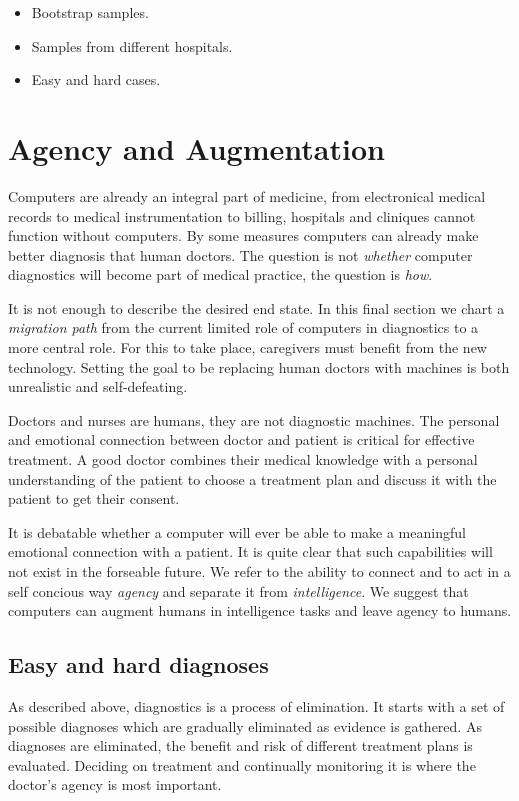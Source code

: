 \documentclass[9pt,twocolumn,twoside]{pnas-new}
\begin{document}
\begin{itemize}
  \item Bootstrap samples.
  \item Samples from different hospitals.
  \item Easy and hard cases.
  \end{itemize}

  \section*{Agency and Augmentation}

  Computers are already an integral part of medicine, from
  electronical medical records to medical instrumentation to billing,
  hospitals and cliniques cannot function without computers. By some
  measures computers can already make better diagnosis that human
  doctors. The question is not {\em whether} computer diagnostics will
  become part of medical practice, the question is {\em how}.

  It is not enough to describe the desired end state. 
  In this final section we chart a {\em migration path} from the
  current limited role of computers in diagnostics to a
  more central role. For this to take place, caregivers must benefit
  from the new technology. Setting the goal to be replacing human
  doctors with machines is both unrealistic and self-defeating.

  Doctors and nurses are humans, they are not diagnostic machines. The
  personal and emotional connection between doctor and patient is
  critical for effective treatment. A good doctor combines their
  medical knowledge with a personal understanding of the patient to
  choose a treatment plan and discuss it with the patient to get their
  consent.

  It is debatable whether a computer will ever be able to
  make a meaningful emotional connection with a patient. It is quite
  clear that such capabilities will not exist in the forseable future.
  We refer to the ability to connect and to act in a self concious
  way {\em agency} and separate it from {\em intelligence}. We suggest
  that computers can augment humans in intelligence tasks and leave
  agency to humans.

  \subsection*{Easy and hard diagnoses}

  As described above, diagnostics is a process of elimination. It
  starts with a set of possible diagnoses which are gradually
  eliminated as evidence is  gathered. As diagnoses are
  eliminated, the benefit and risk of different treatment plans is evaluated.
  Deciding on treatment and continually monitoring it is where the
  doctor's agency is most important.
\end{document}
